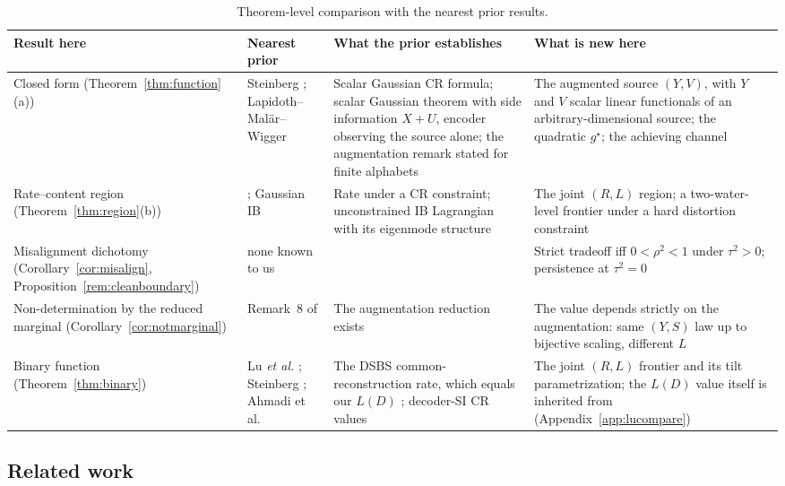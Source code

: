 \documentclass[11pt,onecolumn]{IEEEtran}
\begin{document}
\begin{table}[!t]
\caption{Theorem-level comparison with the nearest prior results.}
\label{tab:whatsnew}
\centering
\footnotesize
\begin{tabular}{p{1.35in}p{1.55in}p{1.55in}p{1.55in}}
\hline
Result here & Nearest prior & What the prior establishes & What is new
here\\
\hline
Closed form (Theorem~\ref{thm:function}(a)) & Steinberg
\cite{steinberg2009}; Lapidoth--Mal\"ar--Wigger \cite{lapidoth2014} &
Scalar Gaussian CR formula; scalar Gaussian theorem with side
information $X+U$, encoder observing the source alone; the augmentation
remark stated for finite alphabets & The augmented source
$(Y,V)$, with $Y$ and $V$ scalar linear functionals of an
arbitrary-dimensional source; the quadratic $g^\star$; the achieving
channel\\
Rate--content region (Theorem~\ref{thm:region}(b)) & \cite{steinberg2009,
lapidoth2014}; Gaussian IB \cite{chechik2005} & Rate under a CR
constraint; unconstrained IB Lagrangian with its eigenmode structure &
The joint $(R,L)$ region; a two-water-level frontier under a hard
distortion constraint\\
Misalignment dichotomy (Corollary~\ref{cor:misalign},
Proposition~\ref{rem:cleanboundary}) & none known to us & & Strict tradeoff iff
$0<\rho^2<1$ under $\tau^2>0$; persistence at $\tau^2=0$\\
Non-determination by the reduced marginal
(Corollary~\ref{cor:notmarginal}) & Remark~8 of \cite{lapidoth2014} &
The augmentation reduction exists & The value depends strictly on the
augmentation: same $(Y,S)$ law up to bijective scaling, different $L$\\
Binary function (Theorem~\ref{thm:binary}) & Lu \emph{et al.}
\cite{lu2016lossy,lu2016binary}; Steinberg \cite{steinberg2009}; Ahmadi et
al. \cite{ahmadi2013} & The DSBS common-reconstruction rate, which equals our
$L(D)$ \cite{lu2016lossy}; decoder-SI CR values \cite{steinberg2009,ahmadi2013}
& The joint $(R,L)$ frontier and its tilt parametrization; the $L(D)$ value
itself is inherited from \cite{lu2016lossy} (Appendix~\ref{app:lucompare})\\
\hline
\end{tabular}
\end{table}

\subsection*{Related work}
\end{document}
